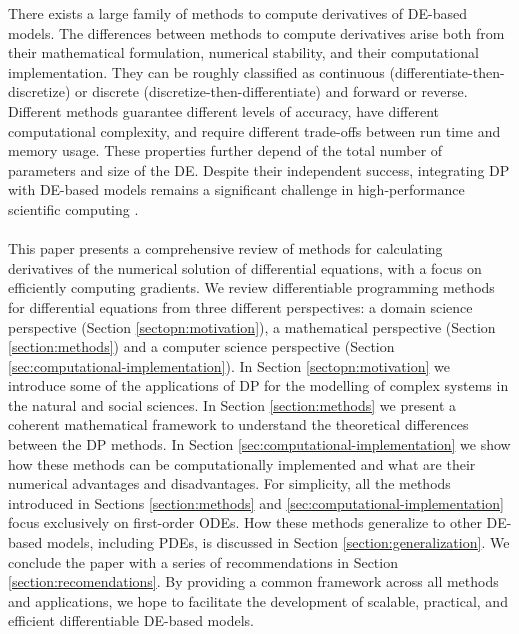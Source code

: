There exists a large family of methods to compute derivatives of DE-based models. 
The differences between methods to compute derivatives arise both from their mathematical formulation, numerical stability, and their computational implementation. 
They can be roughly classified as continuous (differentiate-then-discretize) or discrete (discretize-then-differentiate) and forward or reverse. 
Different methods guarantee different levels of accuracy, have different computational complexity, and require different trade-offs between run time and memory usage. 
These properties further depend of the total number of parameters and size of the DE. 
Despite their independent success, integrating DP with DE-based models remains a significant challenge in high-performance scientific computing \cite{Naumann.2011}.
\\ \\
This paper presents a comprehensive review of methods for calculating derivatives of the numerical solution of differential equations, with a focus on efficiently computing gradients. 
We review differentiable programming methods for differential equations from three different perspectives: a domain science perspective (Section \ref{sectopn:motivation}), a mathematical perspective (Section \ref{section:methods}) and a computer science perspective (Section \ref{sec:computational-implementation}). 
In Section \ref{sectopn:motivation} we introduce some of the applications of DP for the modelling of complex systems in the natural and social sciences. 
In Section \ref{section:methods} we present a coherent mathematical framework to understand the theoretical differences between the DP methods.
In Section \ref{sec:computational-implementation} we show how these methods can be computationally implemented and what are their numerical advantages and disadvantages.
For simplicity, all the methods introduced in Sections \ref{section:methods} and \ref{sec:computational-implementation} focus exclusively on first-order ODEs. 
How these methods generalize to other DE-based models, including PDEs, is discussed in Section \ref{section:generalization}.
We conclude the paper with a series of recommendations in Section \ref{section:recomendations}.
By providing a common framework across all methods and applications, we hope to facilitate the development of scalable, practical, and efficient differentiable DE-based models. 

